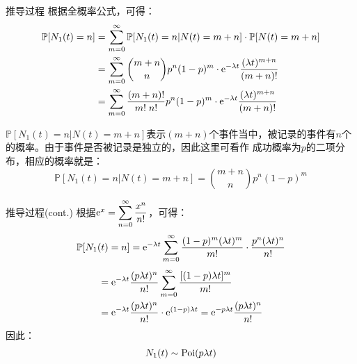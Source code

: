 \documentclass[t]{beamer}
\renewcommand{\Pr}{\mathbb{P}}
\begin{document}
\begin{frame}{推导过程}
    根据全概率公式，可得：
\[ \begin{split}
\Pr[N_1(t)=n]&=\sum_{m=0}^{\infty}{\Pr[N_1(t)=n|N(t)=m+n]}\cdot \Pr[N(t)=m+n]\\
&=\sum_{m=0}^{\infty}{{m+n \choose n}p^n(1-p)^m}\cdot {\rm e}^{-\lambda t}\frac{(\lambda t)^{m+n}}{(m+n)!}\\
&=\sum_{m=0}^{\infty}{\frac{{(m+n)!}}{m!\; n!}	p^n(1-p)^m}\cdot {\rm e}^{-\lambda t}\frac{(\lambda t)^{m+n}}{{(m+n)!}}\\
\end{split} \]

$\Pr[N_1(t)=n|N(t)=m+n]$表示$(m+n)$个事件当中，被记录的事件有$n$个的概率。由于事件是否被记录是独立的，因此这里可看作
成功概率为$p$的二项分布，相应的概率就是：
\[\Pr[N_1(t)=n|N(t)=m+n]={m+n \choose n}p^n(1-p)^m\]
\end{frame}



\begin{frame}{推导过程(cont.)}
    根据${\rm e}^x=\displaystyle\sum_{n=0}^{\infty}\frac{x^n}{n!}$，可得：
\[\begin{split}
\Pr[N_1(t)=n]&= {\rm e}^{-\lambda t}\sum_{m=0}^{\infty}\frac{(1-p)^m(\lambda t)^m}{m!}\cdot\frac{p^n(\lambda t)^n}{n!}\\
\end{split} \]
\[\begin{split} 
&={\rm e}^{-\lambda t}\frac{(p\lambda t)^n}{n!}\sum_{m=0}^{\infty}\frac{[(1-p)\lambda t]^m}{m!}\\
&={\rm e}^{-\lambda t}\frac{(p\lambda t)^n}{n!}\cdot {\rm e}^{(1-p)\lambda t}={\rm e}^{-p\lambda t}\frac{(p\lambda t)^n}{n!}\\
\end{split} \]
因此：$$N_1(t)\sim {\rm Poi}(p\lambda  t)$$
\end{frame}
\end{document}
